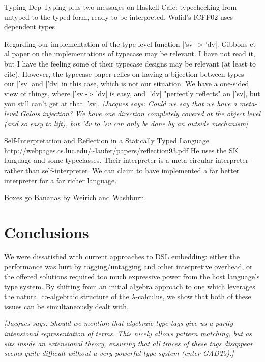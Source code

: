 \documentclass[preprint]{sigplanconf}
\newcommand{\jacques}[1]{{\it [Jacques says: #1]}}
\begin{document}
Typing Dep Typing plus two messages on Haskell-Cafe: typechecking 
from untyped to the typed form, ready to be interpreted. Walid's ICFP02
uses dependent types


Regarding our implementation of the type-level function |'sv -> 'dv|.
Gibbons et al paper on
the implementations of typecase may be relevant. I have not read it,
but I have the feeling some of their typecase designs may be
relevant (at least to cite). 
However, the typecase paper relies on having a 
bijection between types -- our |'sv| and |'dv| in this case, which is not 
our situation.  We have a one-sided view of things, where |'sv -> 'dv| is 
easy, and |'dv| "perfectly reflects" an |'sv|, but you still can't get at 
that |'sv|.  \jacques{Could we say that we have a meta-level Galois
injection?  We have one direction completely covered at the object
level (and so easy to lift), but 'dv to 'sv can only be done by
an outside mechanism}


Self-Interpretation and Reflection in a Statically Typed Language 
\url{http://webpages.cs.luc.edu/~laufer/papers/reflection93.pdf}
He uses the SK language and some typeclasses. Their interpreter is a
meta-circular interpreter -- rather than self-interpreter. We can
claim to have implemented a far better interpreter for a far richer
language.

Boxes go Bananas by Weirich and Washburn.

\section{Conclusions}\label{conclusion}

We were dissatisfied with current approaches to DSL embedding: either
the performance was hurt by tagging/untagging and other interpretive
overhead, or the offered solutions required too much expressive power
from the host language's type system.  By shifting from an initial
algebra approach to one which leverages the natural co-algebraic structure
of the $\lambda$-calculus, we show that both of these issues can be 
simultaneously dealt with.


\jacques{Should we mention that algebraic type tags give us a partly
intensional representation of terms.  This nicely allows pattern matching,
but as sits inside an extensional theory, ensuring that all traces 
of these tags disappear seems quite difficult without a very powerful
type system (enter GADTs).}
\end{document}
